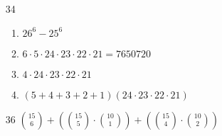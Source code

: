 \documentclass{article}
\begin{document}
\begin{enumerate}
\begin{enumerate}
    \end{enumerate}
  \item[34] 
    \begin{enumerate}
      \item $26^6-25^6$
      \item $6 \cdot 5 \cdot 24 \cdot 23 \cdot 22 \cdot 21 = 7650720$
      \item $4 \cdot 24 \cdot 23 \cdot 22 \cdot 21$
      \item $(5 + 4 + 3 + 2 + 1)(24 \cdot 23 \cdot 22 \cdot 21)$
    \end{enumerate}
  \item[36] ${15\choose6} + ({15\choose5} \cdot {10\choose1}) +
    ({15\choose4} \cdot {10\choose2})$
\end{enumerate}
\end{document}
